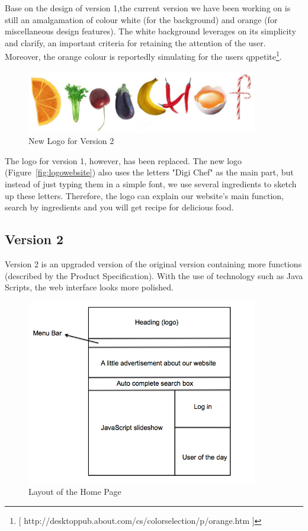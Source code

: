 Base on the design of version 1,the current version we have been working on is still an amalgamation of colour white (for the background) and orange (for miscellaneous design features). The white background leverages on its simplicity and clarify, an important criteria for retaining the attention of the user. Moreover, the orange colour is reportedly simulating for the users qppetite\footnote{[ http://desktoppub.about.com/cs/colorselection/p/orange.htm ]}. 

\begin{figure}[h]
\begin{center}
\includegraphics[width=0.9\textwidth]{logowebsite}
\caption{New Logo for Version 2}
\end{center}
\end{figure}

The logo for version 1, however, has been replaced. The new logo (Figure~\ref{fig:logowebsite}) also uses the letters "Digi Chef" as the main part, but instead of just typing them in a simple font, we use several ingredients to sketch up these letters. Therefore, the logo can explain our website's main function, search by ingredients and you will get  recipe for delicious food. 

\subsection{Version 2}

Version 2 is an upgraded version of the original version containing more functions (described by the Product Specification). With the use of technology such as Java Scripts, the web interface looks more polished. 

\begin{figure}[h]
\begin{center}
\includegraphics[width=0.9\textwidth]{home_page_v2}
\caption{Layout of the Home Page}
\label{fig:home_page}
\end{center}
\end{figure}

